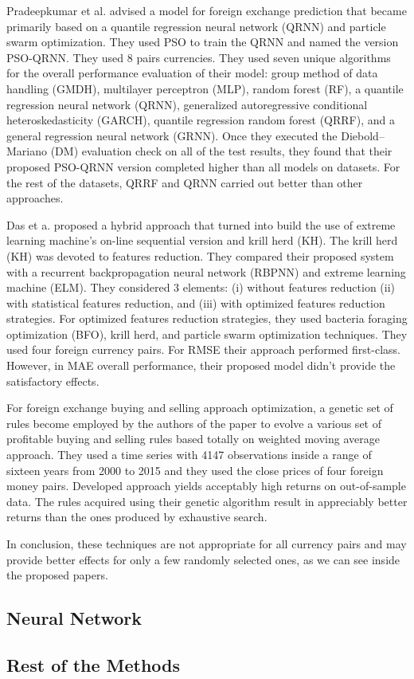 Pradeepkumar et al. \cite{Pradeepkumar17} advised a model for foreign exchange prediction that became primarily based on a quantile regression neural network (QRNN) and particle swarm optimization. They used PSO to train the QRNN and named the version PSO-QRNN. They used 8 pairs currencies. They used seven unique algorithms for the overall performance evaluation of their model: group method of data handling (GMDH), multilayer perceptron (MLP), random forest (RF), a quantile regression neural network (QRNN), generalized autoregressive conditional heteroskedasticity (GARCH), quantile regression random forest (QRRF), and a general regression neural network (GRNN). Once they executed the Diebold–Mariano (DM) evaluation check on all of the test results, they found that their proposed PSO-QRNN version completed higher than all models on  datasets. For the rest of the datasets, QRRF and QRNN carried out better than other approaches.

Das et a. \cite{Das19} proposed a hybrid approach that turned into build the use of extreme learning machine's on-line sequential version and krill herd (KH). The krill herd (KH) was devoted to features reduction. They compared their proposed system with a recurrent backpropagation neural network (RBPNN) and extreme learning machine (ELM). They considered 3 elements: (i) without features reduction (ii) with statistical features reduction, and (iii) with optimized features reduction strategies. For optimized features reduction strategies, they used bacteria foraging optimization (BFO), krill herd, and particle swarm optimization techniques. They used four foreign currency pairs. For RMSE their approach performed first-class. However, in MAE overall performance, their proposed model didn't provide the satisfactory effects.

For foreign exchange buying and selling approach optimization, a genetic set of rules become employed by the authors of the paper  \cite{Galeshchuk17} to evolve a various set of profitable buying and selling rules based totally on weighted moving average approach. They used a time series with 4147 observations inside a range of sixteen years from 2000 to 2015 and they used the close prices of four foreign money pairs. Developed approach yields acceptably high returns on out-of-sample data. The rules acquired using their genetic algorithm result in appreciably better returns than the ones produced by exhaustive search.

In conclusion, these techniques are not appropriate for all currency pairs and may provide better effects for only a few randomly selected ones, as we can see inside the proposed papers.

\subsection{Neural Network}

\subsection{Rest of the Methods}
